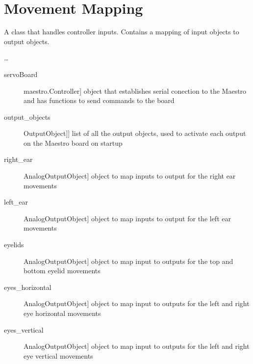 \documentclass[letterpaper,10pt,english]{sphinxmanual}
\begin{document}
\chapter{Movement Mapping}
\label{\detokenize{mapping:module-MovementMap}}\label{\detokenize{mapping:movement-mapping}}\label{\detokenize{mapping::doc}}

\begin{fulllineitems}
\label{\detokenize{mapping:MovementMap.MovementMap}}
\sphinxAtStartPar
A class that handles controller inputs. Contains a mapping of input objects to output objects.

\sphinxAtStartPar
…
\begin{description}
\item[{servoBoard}] \leavevmode{[}maestro.Controller{]}
\sphinxAtStartPar
object that establishes serial conection to the Maestro and has functions to send commands to the board

\item[{output\_objects}] \leavevmode{[}{[}OutputObject{]}{]}
\sphinxAtStartPar
list of all the output objects, used to activate each output on the Maestro board on startup

\item[{right\_ear}] \leavevmode{[}AnalogOutputObject{]}
\sphinxAtStartPar
object to map inputs to output for the right ear movements

\item[{left\_ear}] \leavevmode{[}AnalogOutputObject{]}
\sphinxAtStartPar
object to map inputs to output for the left ear movements

\item[{eyelids}] \leavevmode{[}AnalogOutputObject{]}
\sphinxAtStartPar
object to map input to outputs for the top and bottom eyelid movements

\item[{eyes\_horizontal}] \leavevmode{[}AnalogOutputObject{]}
\sphinxAtStartPar
object to map input to outputs for the left and right eye horizontal movements

\item[{eyes\_vertical}] \leavevmode{[}AnalogOutputObject{]}
\sphinxAtStartPar
object to map input to outputs for the left and right eye vertical movements


\end{description}
\end{fulllineitems}
\end{document}
